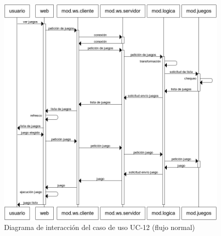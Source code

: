 \begin{enumerate}
  \begin{figure}[h]
    \begin{center}
      \includegraphics[width=\textwidth]{images/uc-12.png}
      \caption{Diagrama de interacción del caso de uso UC-12 (flujo normal)}
      \label{fig::uc-12}
    \end{center}
  \end{figure}
  



\end{enumerate}
